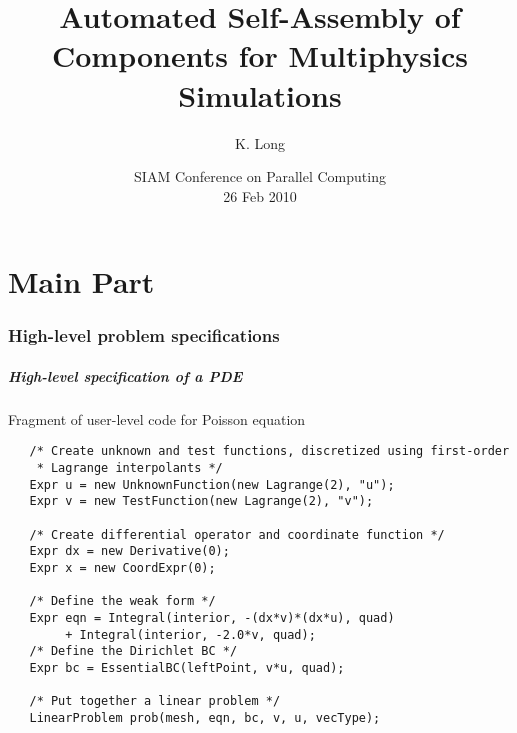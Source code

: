 \documentclass[10pt,xcolor=dvipsnames]{beamer}
\title{Automated Self-Assembly of Components for Multiphysics Simulations}
\author{K. Long}
\institute[TTU]{%
Department of Mathematics and Statistics\\
Texas Tech University}
\date{SIAM Conference on Parallel Computing \\ 26 Feb 2010 }
\begin{document}
\frame{\titlepage}




\part{Main Part}

\section{High-level problem specifications}

\begin{frame}[fragile]

\frametitle{High-level specification of a PDE}

  \lstset{language=C++,tabsize=2,basicstyle=\scriptsize}
  \begin{block}{Fragment of user-level code for Poisson equation}
  \begin{lstlisting}
   /* Create unknown and test functions, discretized using first-order
    * Lagrange interpolants */
   Expr u = new UnknownFunction(new Lagrange(2), "u");
   Expr v = new TestFunction(new Lagrange(2), "v");

   /* Create differential operator and coordinate function */
   Expr dx = new Derivative(0);
   Expr x = new CoordExpr(0);

   /* Define the weak form */
   Expr eqn = Integral(interior, -(dx*v)*(dx*u), quad)
        + Integral(interior, -2.0*v, quad);
   /* Define the Dirichlet BC */
   Expr bc = EssentialBC(leftPoint, v*u, quad);

   /* Put together a linear problem */
   LinearProblem prob(mesh, eqn, bc, v, u, vecType);
  \end{lstlisting}
  \end{block}

\end{frame}
\end{document}
